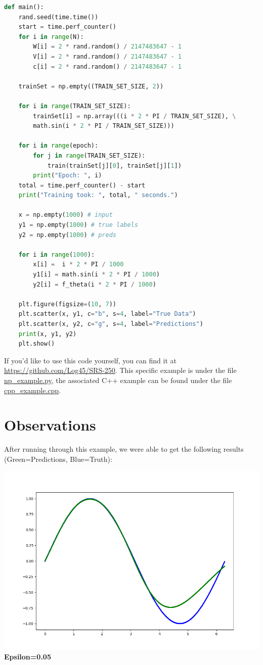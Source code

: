 \documentclass[12pt, letter]{article}
\begin{document}
\begin{lstlisting}[language=Python]
def main():
    rand.seed(time.time())
    start = time.perf_counter()
    for i in range(N):
        W[i] = 2 * rand.random() / 2147483647 - 1
        V[i] = 2 * rand.random() / 2147483647 - 1
        c[i] = 2 * rand.random() / 2147483647 - 1

    trainSet = np.empty((TRAIN_SET_SIZE, 2))
    
    for i in range(TRAIN_SET_SIZE):
        trainSet[i] = np.array(((i * 2 * PI / TRAIN_SET_SIZE), \
        math.sin(i * 2 * PI / TRAIN_SET_SIZE)))

    for i in range(epoch):
        for j in range(TRAIN_SET_SIZE):
            train(trainSet[j][0], trainSet[j][1])
        print("Epoch: ", i)
    total = time.perf_counter() - start
    print("Training took: ", total, " seconds.")

    x = np.empty(1000) # input
    y1 = np.empty(1000) # true labels
    y2 = np.empty(1000) # preds

    for i in range(1000):
        x[i] =  i * 2 * PI / 1000
        y1[i] = math.sin(i * 2 * PI / 1000)
        y2[i] = f_theta(i * 2 * PI / 1000)
    
    plt.figure(figsize=(10, 7))
    plt.scatter(x, y1, c="b", s=4, label="True Data")
    plt.scatter(x, y2, c="g", s=4, label="Predictions")
    print(x, y1, y2)
    plt.show()

\end{lstlisting}

If you’d like to use this code yourself, you can find it at \href{https://github.com/Log45/SRS-250}{https://github.com/Log45/SRS-250}. This specific example is under the file \href{https://github.com/Log45/SRS-250/blob/main/np_example.py}{np\_example.py}, the associated C++ example can be found under the file \href{https://github.com/Log45/SRS-250/blob/main/cpp_example.cpp}{cpp\_example.cpp}.

\section{Observations}

After running through this example, we were able to get the following results (Green=Predictions, Blue=Truth):


\includegraphics[width=.8\textwidth]{images/Figure_1.png}
\newline
\centering
\textbf{Epsilon=0.05} 
\end{document}
